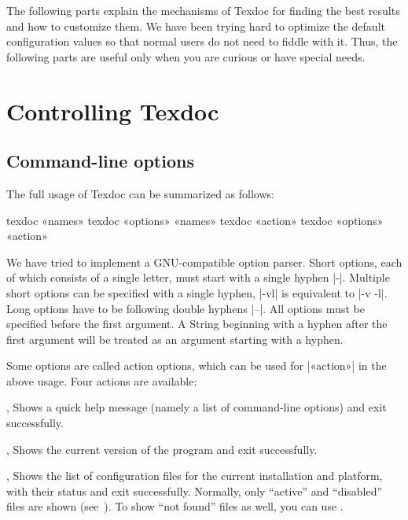 \documentclass{texdoc-doc}
\begin{document}
The following parts explain the mechanisms of Texdoc for finding the best
results and how to customize them. We have been trying hard to optimize the
default configuration values so that normal users do not need to fiddle with
it. Thus, the following parts are useful only when you are curious or have
special needs.

\clearpage

\section{Controlling Texdoc}

\subsection{Command-line options}
\label{sec:cl}

The full usage of Texdoc can be summarized as follows:
%
\begin{htcode}
texdoc «names»
texdoc «options» «names»
texdoc «action»
texdoc «options» «action»
\end{htcode}

We have tried to implement a GNU-compatible option parser. Short options, each of
which consists of a single letter, must start with a single hyphen |-|.
Multiple short options can be specified with a single hyphen, \eg |-vl| is
equivalent to |-v -l|. Long options have to be following double hyphens |--|.
All options must be specified before the first argument. A String beginning
with a hyphen after the first argument will be treated as an argument starting
with a hyphen.

Some options are called action options, which can be used for |«action»| in the
above usage. Four actions are available:

\begin{clopt}{, }
Shows a quick help message (namely a list of command-line options) and exit
successfully.
\end{clopt}

\begin{clopt}{, }
Shows the current version of the program and exit successfully.
\end{clopt}

\begin{clopt}{, }
Shows the list of configuration files for the current installation and
platform, with their status and exit successfully. Normally, only ``active''
and ``disabled'' files are shown (see~). To show ``not
found'' files as well, you can use .
\end{clopt}
\end{document}
